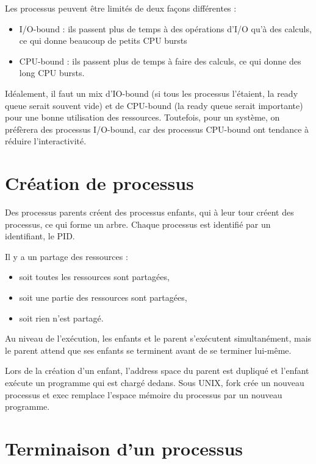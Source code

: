 Les processus peuvent être limités de deux façons différentes :

\begin{itemize}
	\item I/O-bound : ils passent plus de temps à des opérations d'I/O qu'à des calculs, ce qui donne beaucoup de petits CPU bursts
	\item CPU-bound : ils passent plus de temps à faire des calculs, ce qui donne des long CPU bursts.
\end{itemize}

Idéalement, il faut un mix d'IO-bound (si tous les processus l'étaient, la ready queue serait souvent vide) et de CPU-bound (la ready queue serait importante) pour une bonne utilisation des ressources. Toutefois, pour un système, on préfèrera des processus I/O-bound, car des processus CPU-bound ont tendance à réduire l'interactivité.


\section{Création de processus}

Des processus parents créent des processus enfants, qui à leur tour créent des processus, ce qui forme un arbre. Chaque processus est identifié par un identifiant, le PID.

Il y a un partage des ressources : 

\begin{itemize}
	\item soit toutes les ressources sont partagées,
	\item soit une partie des ressources sont partagées,
	\item soit rien n'est partagé.
\end{itemize}

Au niveau de l'exécution, les enfants et le parent s'exécutent simultanément, mais le parent attend que ses enfants se terminent avant de se terminer lui-même.

Lors de la création d'un enfant, l'address space du parent est dupliqué et l'enfant exécute un programme qui est chargé dedans. Sous UNIX, fork crée un nouveau processus et exec remplace l'espace mémoire du processus par un nouveau programme.


\section{Terminaison d'un processus}

